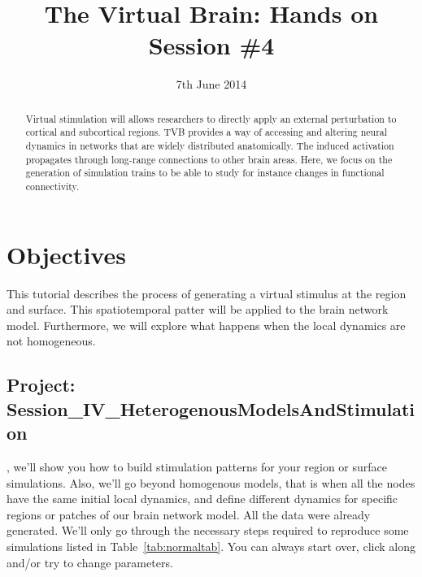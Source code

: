 \documentclass{tufte-handout}
\title{The Virtual Brain: Hands on Session \#4}
\date{7th June 2014}
\begin{document}

\newpage
\ClearWallPaper
\begin{abstract}
\noindent Virtual stimulation will allows researchers to directly apply an external perturbation to cortical and subcortical regions. TVB provides
a way of accessing and altering neural dynamics in networks that are widely
distributed anatomically. The induced activation propagates through long-range
connections to other brain areas. Here, we focus on the generation of
simulation trains to be able to study for instance changes in
functional connectivity.
\begin{marginfigure}%
  \label{fig:marginfig}
\end{marginfigure}
\end{abstract}


\section{Objectives}\label{sec:objectives}

This tutorial describes the process of generating a virtual stimulus at the
region and surface. This spatiotemporal patter will be applied to the brain network model. Furthermore, we will explore what happens when the local dynamics are not homogeneous.


\subsection{Project: Session\_IV\_HeterogenousModelsAndStimulation}\label{sec:project_data}

, we'll show you how to build stimulation patterns for your region or surface simulations. Also, we'll go beyond homogenous models, that is when all the nodes have the same initial local dynamics,  and define different dynamics for specific regions or patches of our brain network model. 
All the data were already generated. We'll only go through the necessary steps required to reproduce some simulations listed in Table~\ref{tab:normaltab}. You can always start over, click along and/or try to change parameters.
\end{document}
